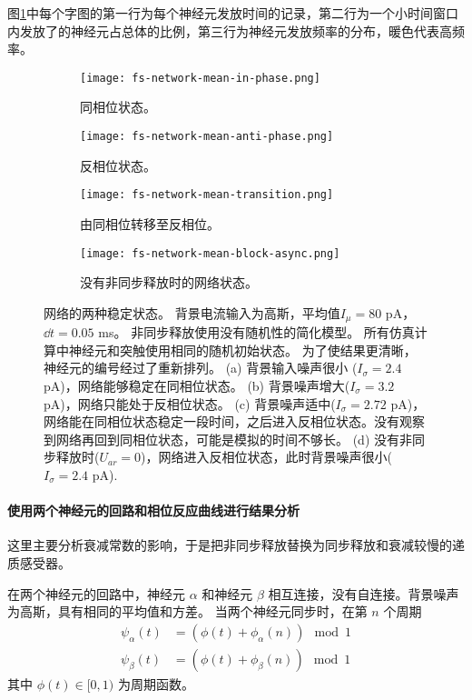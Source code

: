 图\ref{figure:network-stability}中每个字图的第一行为每个神经元发放时间的记录，第二行为一个小时间窗口内发放了的神经元占总体的比例，第三行为神经元发放频率的分布，暖色代表高频率。


\begin{figure}
\centering
    \begin{subfigure}{0.45\textwidth}
        \texttt{[image: fs-network-mean-in-phase.png]}
        \caption{同相位状态。}
    \end{subfigure}
    \begin{subfigure}{0.45\textwidth}
        \texttt{[image: fs-network-mean-anti-phase.png]}
        \caption{反相位状态。}
    \end{subfigure}
    \begin{subfigure}{0.45\textwidth}
        \texttt{[image: fs-network-mean-transition.png]}
        \caption{由同相位转移至反相位。}
    \end{subfigure}
    \begin{subfigure}{0.45\textwidth}
        \texttt{[image: fs-network-mean-block-async.png]}
        \caption{没有非同步释放时的网络状态。}
    \end{subfigure}
\caption{网络的两种稳定状态。
背景电流输入为高斯，平均值$I_{\mu} = 80$ pA，$\dd{t} = 0.05$ ms。
非同步释放使用没有随机性的简化模型。
所有仿真计算中神经元和突触使用相同的随机初始状态。
为了使结果更清晰，神经元的编号经过了重新排列。
(a) 背景输入噪声很小 ($I_{\sigma} = 2.4$ pA)，网络能够稳定在同相位状态。
(b) 背景噪声增大($I_{\sigma} = 3.2$ pA)，网络只能处于反相位状态。
(c) 背景噪声适中($I_{\sigma} = 2.72$ pA)，网络能在同相位状态稳定一段时间，之后进入反相位状态。没有观察到网络再回到同相位状态，可能是模拟的时间不够长。
(d) 没有非同步释放时($U_{ar} = 0$)，网络进入反相位状态，此时背景噪声很小($I_{\sigma} = 2.4$ pA).}
\label{figure:network-stability}
\end{figure}

\paragraph{使用两个神经元的回路和相位反应曲线进行结果分析}
这里主要分析衰减常数的影响，于是把非同步释放替换为同步释放和衰减较慢的递质感受器。

在两个神经元的回路中，神经元 $\alpha$ 和神经元 $\beta$ 相互连接，没有自连接。背景噪声为高斯，具有相同的平均值和方差。
当两个神经元同步时，在第 $n$ 个周期
\begin{align}
\psi_{\alpha}\left(t\right) &= \left(\phi\left(t\right) + \phi_{\alpha}\left(n\right)\right) \mod 1 \\
\psi_{\beta}\left(t\right) &= \left(\phi\left(t\right) + \phi_{\beta}\left(n\right)\right) \mod 1
\end{align}
其中 $\phi\left(t\right) \in [0,1)$ 为周期函数。

